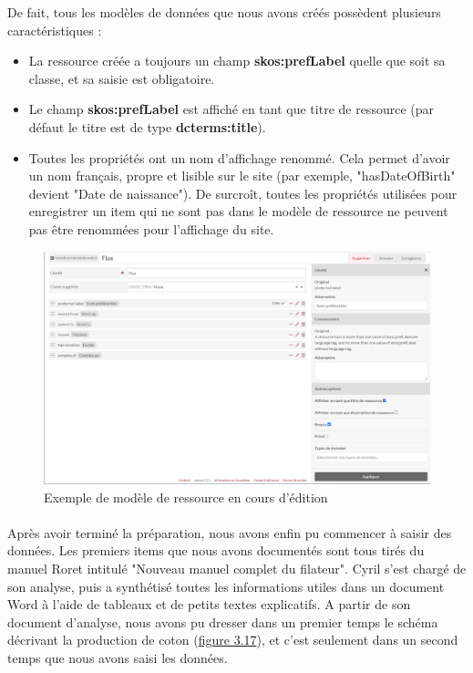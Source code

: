 De fait, tous les modèles de données que nous avons créés possèdent plusieurs caractéristiques :
\begin{itemize}
    \item[\ding{103}] La ressource créée a toujours un champ \textbf{skos:prefLabel} quelle que soit sa classe, et sa saisie est obligatoire.
    \item[\ding{103}] Le champ \textbf{skos:prefLabel} est affiché en tant que titre de ressource (par défaut le titre est de type \textbf{dcterms:title}).
    \item[\ding{103}] Toutes les propriétés ont un nom d'affichage renommé. Cela permet d'avoir un nom français, propre et lisible sur le site (par exemple, "hasDateOfBirth" devient "Date de naissance"). De surcroît, toutes les propriétés utilisées pour enregistrer un item qui ne sont pas dans le modèle de ressource ne peuvent pas être renommées pour l'affichage du site.
\end{itemize}

\begin{figure} [H]
    \centering
    \includegraphics[width=1\textwidth]{assets/omeka/screen_omeka_modele_ressource.png}
    \caption{Exemple de modèle de ressource en cours d'édition}
    \label{fig:modeleRessourceOmeka}
\end{figure}

\paragraph{} \hspace{10mm}
Après avoir terminé la préparation, nous avons enfin pu commencer à saisir des données. Les premiers items que nous avons documentés sont tous tirés du manuel Roret intitulé "Nouveau manuel complet du filateur". Cyril s'est chargé de son analyse, puis a synthétisé toutes les informations utiles dans un document Word à l'aide de tableaux et de petits textes explicatifs. A partir de son document d'analyse, nous avons pu dresser dans un premier temps le schéma décrivant la production de coton (\hyperref[fig:schemaRoretTTM]{figure 3.17}), et c'est seulement dans un second temps que nous avons saisi les données.

